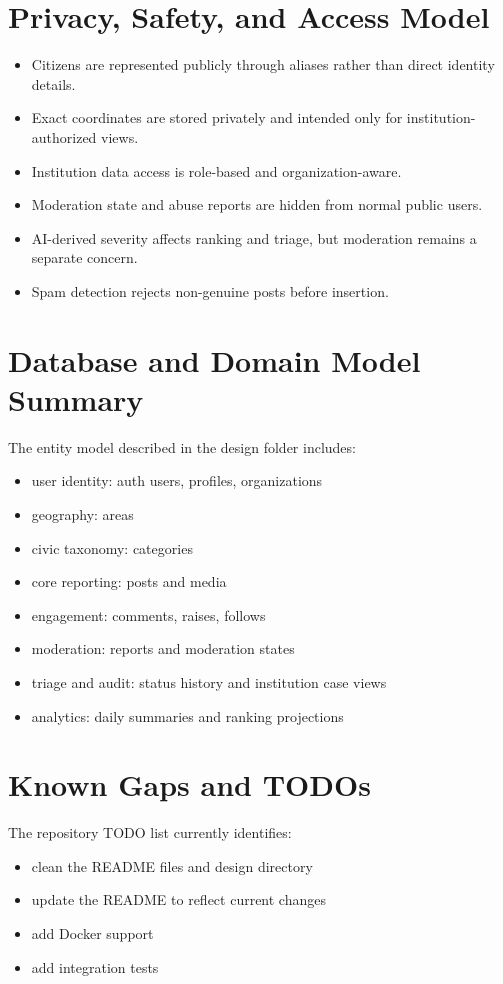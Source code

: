 \documentclass[11pt,a4paper]{article}
\begin{document}
\section{Privacy, Safety, and Access Model}
\begin{itemize}
  \item Citizens are represented publicly through aliases rather than direct identity details.
  \item Exact coordinates are stored privately and intended only for institution-authorized views.
  \item Institution data access is role-based and organization-aware.
  \item Moderation state and abuse reports are hidden from normal public users.
  \item AI-derived severity affects ranking and triage, but moderation remains a separate concern.
  \item Spam detection rejects non-genuine posts before insertion.
\end{itemize}

\section{Database and Domain Model Summary}
The entity model described in the design folder includes:
\begin{itemize}
  \item user identity: auth users, profiles, organizations
  \item geography: areas
  \item civic taxonomy: categories
  \item core reporting: posts and media
  \item engagement: comments, raises, follows
  \item moderation: reports and moderation states
  \item triage and audit: status history and institution case views
  \item analytics: daily summaries and ranking projections
\end{itemize}

\section{Known Gaps and TODOs}
The repository TODO list currently identifies:
\begin{itemize}
  \item clean the README files and design directory
  \item update the README to reflect current changes
  \item add Docker support
  \item add integration tests
\end{itemize}
\end{document}
